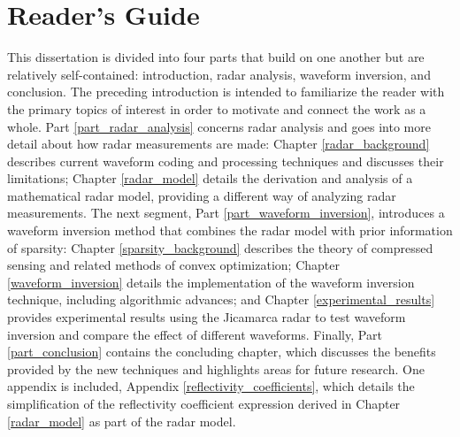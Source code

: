 \section{Reader's Guide}
\label{outline}
This dissertation is divided into four parts that build on one another but are relatively self-contained: introduction, radar analysis, waveform inversion, and conclusion. The preceding introduction is intended to familiarize the reader with the primary topics of interest in order to motivate and connect the work as a whole. Part \ref{part_radar_analysis} concerns radar analysis and goes into more detail about how radar measurements are made: Chapter \ref{radar_background} describes current waveform coding and processing techniques and discusses their limitations; Chapter \ref{radar_model} details the derivation and analysis of a mathematical radar model, providing a different way of analyzing radar measurements. The next segment, Part \ref{part_waveform_inversion}, introduces a waveform inversion method that combines the radar model with prior information of sparsity: Chapter \ref{sparsity_background} describes the theory of compressed sensing and related methods of convex optimization; Chapter \ref{waveform_inversion} details the implementation of the waveform inversion technique, including algorithmic advances; and Chapter \ref{experimental_results} provides experimental results using the Jicamarca radar to test waveform inversion and compare the effect of different waveforms. Finally, Part \ref{part_conclusion} contains the concluding chapter, which discusses the benefits provided by the new techniques and highlights areas for future research. One appendix is included, Appendix \ref{reflectivity_coefficients}, which details the simplification of the reflectivity coefficient expression derived in Chapter \ref{radar_model} as part of the radar model.

